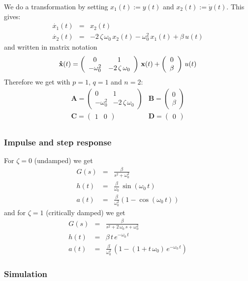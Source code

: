 \documentclass[a4paper,12pt]{article}
\renewcommand{\Vec}[1]{{\bf #1}}
\newcommand{\Mat}[1]{\mathbf{#1}}
\newcommand{\SubSubSection}[2]{\subsubsection{#2}\label{subsubsection:#1}}
\begin{document}
We do a transformation by setting $x_1(t):=y(t)$ and $x_2(t):=\dot{y}(t)$. This
gives:
\begin{eqnarray}
	\dot{x_1}(t)&=&x_2(t)\\
	\dot{x_2}(t)&=&-2\,\zeta\,\omega_0\,x_2(t)-\omega_0^2\,x_1(t)+\beta\,u(t)
\end{eqnarray}
and written in matrix notation
\begin{equation}
\Vec{\dot{x}}(t)=\left(\begin{array}{cc}0 & 1\\-\omega_0^2 & -2\,\zeta\,\omega_0\end{array}\right)\,\Vec{x}(t)+\left(\begin{array}{c}0\\\beta\end{array}\right)\,u(t)
\end{equation}
Therefore we get with $p=1$, $q=1$ and $n=2$:
\begin{equation}
\begin{array}{ll}
	\Mat{A}=\left(\begin{array}{cc}
		0 & 1\\
		-\omega_0^2 & -2\,\zeta\,\omega_0
	\end{array}\right) &
	\Mat{B}=\left(\begin{array}{c}
		0\\
		\beta
	\end{array}\right)\\[4ex]
	\Mat{C}=\left(\begin{array}{cc}
		1 & 0
	\end{array}\right) &
	\Mat{D}=\left(\begin{array}{c}
		0
	\end{array}\right)\\
\end{array}
\end{equation}

\SubSubSection{pulsestepA}{Impulse and step response}

For $\zeta=0$ (undamped) we get
\begin{eqnarray}
G(s)&=&\frac{\beta}{s^2+\omega_0^2}\\
h(t)&=&\frac{\beta}{\omega_0}\,\sin(\omega_0\,t)\\
a(t)&=&\frac{\beta}{\omega_0^2}\left(1-\cos(\omega_0\,t)\right)
\end{eqnarray}
and for $\zeta=1$ (critically damped) we get
\begin{eqnarray}
G(s)&=&\frac{\beta}{s^2+2\,\omega_0\,s+\omega_0^2}\\
h(t)&=&\beta\,t\,e^{-\omega_0\,t}\\
a(t)&=&\frac{\beta}{\omega_0^2}\,\left(1-\left(1+t\,\omega_0\right)\,e^{-\omega_0\,t}\right)
\end{eqnarray}

\SubSubSection{simuA}{Simulation}

\end{document}

